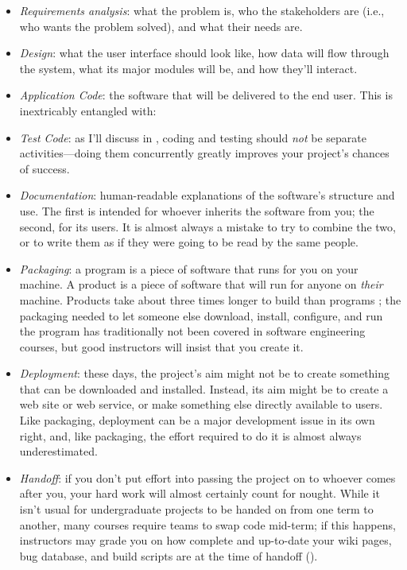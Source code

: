 \documentclass{report}
\begin{document}
\begin{itemize}

  \item \emph{Requirements analysis}: what the problem is, who the
  stakeholders are (i.e., who wants the problem solved), and what
  their needs are.

  \item \emph{Design}: what the user interface should look like, how
  data will flow through the system, what its major modules will be,
  and how they'll interact.

  \item \emph{Application Code}: the software that will be delivered
  to the end user.  This is inextricably entangled with:

  \item \emph{Test Code}: as I'll discuss in ,
  coding and testing should \emph{not} be separate activities---doing
  them concurrently greatly improves your project's chances of
  success.

  \item \emph{Documentation}: human-readable explanations of the
  software's structure and use.  The first is intended for whoever
  inherits the software from you; the second, for its users.  It is
  almost always a mistake to try to combine the two, or to write them
  as if they were going to be read by the same people.

  \item \emph{Packaging}: a program is a piece of software that runs
  for you on your machine.  A product is a piece of software that will
  run for anyone on \emph{their} machine.  Products take about three
  times longer to build than programs
  \cite{b:brooks-mythical-man-month}; the packaging needed to let
  someone else download, install, configure, and run the program has
  traditionally not been covered in software engineering courses, but
  good instructors will insist that you create it.

  \item \emph{Deployment}: these days, the project's aim might not be
  to create something that can be downloaded and installed.  Instead,
  its aim might be to create a web site or web service, or make
  something else directly available to users.  Like packaging,
  deployment can be a major development issue in its own right, and,
  like packaging, the effort required to do it is almost always
  underestimated.

  \item \emph{Handoff}: if you don't put effort into passing the
  project on to whoever comes after you, your hard work will almost
  certainly count for nought.  While it isn't usual for undergraduate
  projects to be handed on from one term to another, many courses
  require teams to swap code mid-term; if this happens, instructors
  may grade you on how complete and up-to-date your wiki pages, bug
  database, and build scripts are at the time of handoff
  ().


\end{itemize}
\end{document}
